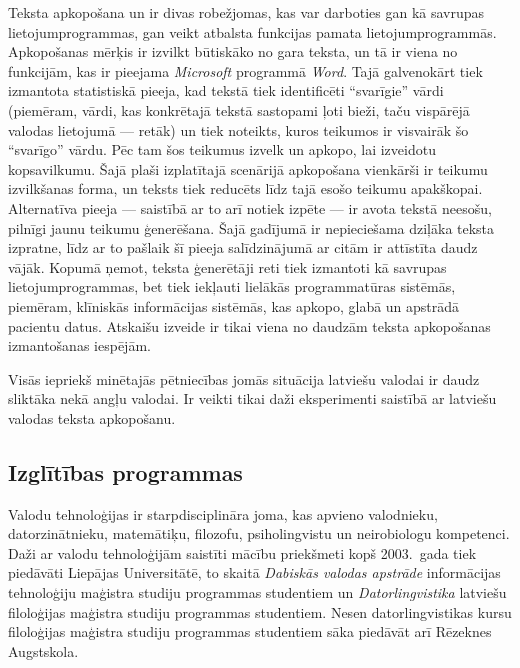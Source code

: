 \begin{multicols}{2}

Teksta apkopošana un  ir divas robežjomas, kas var darboties gan kā savrupas lietojumprogrammas, gan veikt atbalsta funkcijas pamata lietojumprogrammās. 
Apkopošanas mērķis ir izvilkt būtiskāko no gara teksta, un tā ir viena no funk\-cijām, kas ir pieejama \textit{Microsoft} programmā \textit{Word}. 
Tajā galvenokārt tiek izmantota statistiskā pieeja, kad tekstā tiek identificēti “svarīgie” vārdi (piemēram, vārdi, kas konkrētajā tekstā sastopami ļoti bieži, taču vispārējā valodas lietojumā — retāk) un tiek noteikts, kuros teikumos ir visvairāk šo “svarīgo” vārdu. 
Pēc tam šos teikumus izvelk un apkopo, lai izveidotu kopsavilkumu. 
Šajā plaši izplatītajā scenārijā apkopošana vienkārši ir teikumu izvilkšanas forma, un teksts tiek reducēts līdz tajā esošo teikumu apakškopai. 
Alternatīva pieeja — saistībā ar to arī notiek izpēte — ir avota tekstā neesošu, pilnīgi jaunu teikumu ģenerēšana. 
Šajā gadījumā ir nepieciešama dziļāka teksta izpratne, līdz ar to pašlaik šī pieeja salīdzinājumā ar citām ir attīstīta daudz vājāk. 
Kopumā ņemot, teksta ģenerētāji reti tiek izmantoti kā savrupas lietojumprogrammas, bet tiek iekļauti lielākās programmatūras sistēmās, piemēram, klīniskās informācijas sistēmās, kas apkopo, glabā un apstrādā pacientu datus. 
Atskaišu izveide ir tikai viena no daudzām teksta apkopošanas izmantošanas iespējām. 

Visās iepriekš minētajās pētniecības jomās situācija latviešu valodai ir daudz sliktāka nekā angļu valodai. 
Ir veikti tikai daži eksperimenti saistībā ar latviešu valodas teksta apkopošanu.

\subsection{Izglītības programmas}

Valodu tehnoloģijas ir starpdisciplināra joma, kas apvieno valodnieku, datorzinātnieku, matemātiķu, filozofu, psiholingvistu un neirobiologu kompetenci. 
Daži ar valodu tehnoloģijām saistīti mācību priekšmeti kopš 2003.~gada tiek piedāvāti Liepājas Universitātē, to skaitā \textit{Dabiskās valodas apstrāde} informācijas tehnoloģiju maģistra studiju programmas studentiem un \textit{Datorlingvistika} latviešu filoloģijas maģistra studiju programmas studentiem.
Nesen datorlingvistikas kursu filoloģijas maģistra studiju programmas studentiem sāka piedāvāt arī Rēzeknes Augstskola. 


\end{multicols}
